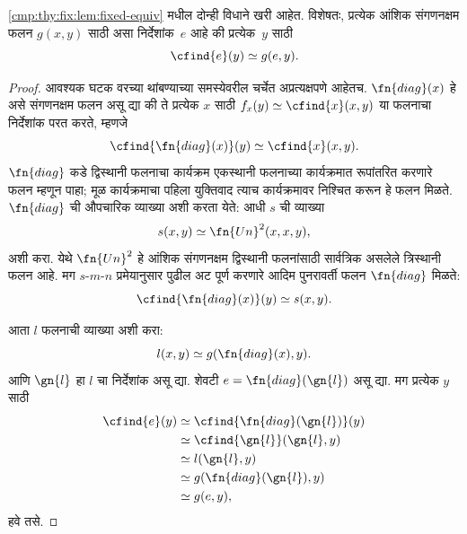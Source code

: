 \begin{thm}
\ref{cmp:thy:fix:lem:fixed-equiv} मधील दोन्ही विधाने खरी आहेत.
विशेषतः, प्रत्येक आंशिक संगणनक्षम फलन $g(x,y)$ साठी
असा निर्देशांक~$e$ आहे की प्रत्येक~$y$ साठी
\[\cfind{e}(y) \simeq g(e,y).
\]
\end{thm}

\begin{proof}
आवश्यक घटक वरच्या थांबण्याच्या समस्येवरील चर्चेत अप्रत्यक्षपणे
आहेतच. $\fn{diag}(x)$ हे असे संगणनक्षम फलन असू द्या की
ते प्रत्येक $x$ साठी $f_x(y) \simeq \cfind{x}(x,y)$
या फलनाचा निर्देशांक परत करते, म्हणजे
\[\cfind{\fn{diag}(x)}(y) \simeq \cfind{x}(x,y).
\]
$\fn{diag}$ कडे द्विस्थानी फलनाचा कार्यक्रम एकस्थानी
फलनाच्या कार्यक्रमात रूपांतरित करणारे फलन म्हणून पाहा;
मूळ कार्यक्रमाचा पहिला युक्तिवाद त्याच कार्यक्रमावर निश्चित
करून हे फलन मिळते. $\fn{diag}$ ची औपचारिक व्याख्या अशी
करता येते: आधी $s$ ची व्याख्या
\[s(x,y) \simeq \fn{Un}^2(x,x,y),
\]
अशी करा. येथे $\fn{Un}^2$ हे आंशिक
संगणनक्षम द्विस्थानी फलनांसाठी सार्वत्रिक असलेले त्रिस्थानी
फलन आहे. मग $s$-$m$-$n$ प्रमेयानुसार पुढील अट पूर्ण करणारे
आदिम पुनरावर्ती फलन $\fn{diag}$ मिळते:
\[\cfind{\fn{diag}(x)}(y) \simeq s(x,y).
\]

आता $l$ फलनाची व्याख्या अशी करा:
\[l(x,y) \simeq g(\fn{diag}(x),y).
\]
आणि $\gn{l}$ हा $l$ चा निर्देशांक असू द्या. शेवटी
$e = \fn{diag}(\gn{l})$ असू द्या. मग प्रत्येक $y$ साठी
\begin{align*}
\cfind{e}(y) & \simeq \cfind{\fn{diag}(\gn{l})}(y) \\
& \simeq \cfind{\gn{l}}(\gn{l}, y) \\
& \simeq l(\gn{l}, y) \\
& \simeq g(\fn{diag}(\gn{l}),y) \\
& \simeq g(e, y),
\end{align*}
हवे तसे.
\end{proof}

